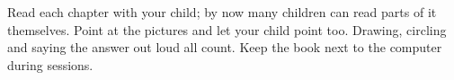 \documentclass[track=junior,level=3]{kidscode}
\begin{document}

\begin{grownup}
Read each chapter with your child; by now many children can read parts of it themselves. Point at
the pictures and let your child point too. Drawing, circling and saying the answer out loud all
count. Keep the book next to the computer during sessions.
\end{grownup}
\kcweeklytoc
{}
\end{document}
